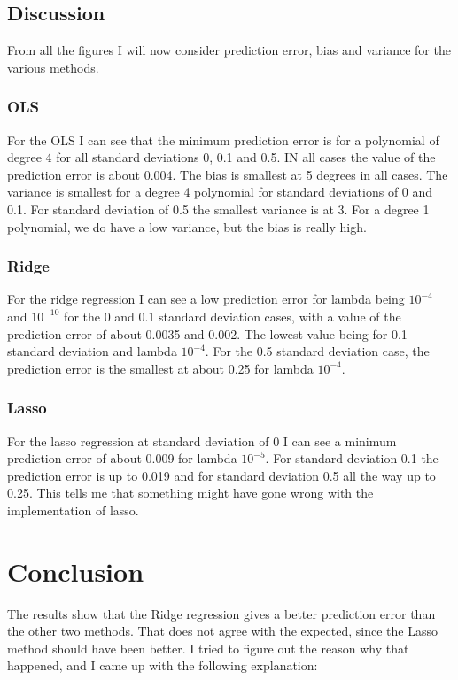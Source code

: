 \medskip

\subsection{Discussion}
From all the figures I will now consider prediction error, bias and variance for the various methods.

\subsubsection{OLS}
For the OLS I can see that the minimum prediction error is for a polynomial of degree 4 for all standard deviations 0, 0.1 and 0.5. IN all cases the value of the prediction error is about 0.004. The bias is smallest at 5 degrees in all cases. The variance is smallest for a degree 4 polynomial for standard deviations of 0 and 0.1. For standard deviation of 0.5 the smallest variance is at 3. For a degree 1 polynomial, we do have a low variance, but the bias is really high. 

\subsubsection{Ridge}
For the ridge regression I can see a low prediction error for lambda being $10^{-4}$ and $10^{-10}$ for the 0 and 0.1 standard deviation cases, with a value of the prediction error of about 0.0035 and 0.002. The lowest value being for 0.1 standard deviation and lambda $10^{-4}$. For the 0.5 standard deviation case, the prediction error is the smallest at about 0.25 for lambda $10^{-4}$.

\subsubsection{Lasso}
For the lasso regression at standard deviation of 0 I can see a minimum prediction error of about 0.009 for lambda $10^{-5}$. For standard deviation 0.1 the prediction error is up to 0.019 and for standard deviation 0.5 all the way up to 0.25. This tells me that something might have gone wrong with the implementation of lasso. 

\section{Conclusion}

The results show that the Ridge regression gives a better prediction error than the other two methods. That does not agree with the expected, since the Lasso method should have been better. I tried to figure out the reason why that happened, and I came up with the following explanation:

